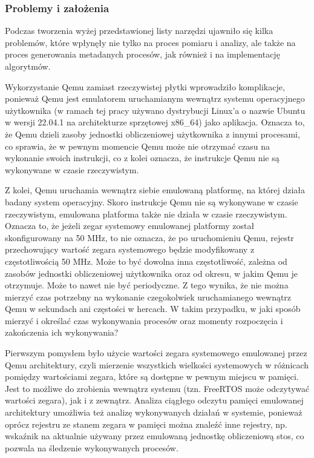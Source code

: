 \documentclass[../../main]{subfiles}
\begin{document}
\subsubsection{Problemy i założenia}

Podczas tworzenia wyżej przedstawionej listy narzędzi ujawniło się kilka problemów, które wpłynęły nie tylko na proces pomiaru i analizy, ale także na proces generowania metadanych procesów, jak również i na implementację algorytmów.

Wykorzystanie Qemu zamiast rzeczywistej płytki wprowadziło komplikacje, ponieważ Qemu jest emulatorem uruchamianym wewnątrz systemu operacyjnego użytkownika (w ramach tej pracy używano dystrybucji Linux'a o nazwie Ubuntu w wersji 22.04.1 na architekturze sprzętowej x86\_64) jako aplikacja. Oznacza to, że Qemu dzieli zasoby jednostki obliczeniowej użytkownika z innymi procesami, co sprawia, że w pewnym momencie Qemu może nie otrzymać czasu na wykonanie swoich instrukcji, co z kolei oznacza, że instrukcje Qemu nie są wykonywane w czasie rzeczywistym.

Z kolei, Qemu uruchamia wewnątrz siebie emulowaną platformę, na której działa badany system operacyjny. Skoro instrukcje Qemu nie są wykonywane w czasie rzeczywistym, emulowana platforma także nie działa w czasie rzeczywistym. Oznacza to, że jeżeli zegar systemowy emulowanej platformy został skonfigurowany na 50 MHz, to nie oznacza, że po uruchomieniu Qemu, rejestr przechowujący wartość zegara systemowego będzie modyfikowany z częstotliwością 50 MHz. Może to być dowolna inna częstotliwość, zależna od zasobów jednostki obliczeniowej użytkownika oraz od okresu, w jakim Qemu je otrzymuje. Może to nawet nie być periodyczne. Z tego wynika, że nie można mierzyć czas potrzebny na wykonanie czegokolwiek uruchamianego wewnątrz Qemu w sekundach ani częstości w hercach. W takim przypadku, w jaki sposób mierzyć i określać czas wykonywania procesów oraz momenty rozpoczęcia i zakończenia ich wykonywania?

Pierwszym pomysłem było użycie wartości zegara systemowego emulowanej przez Qemu architektury, czyli mierzenie wszystkich wielkości systemowych w różnicach pomiędzy wartościami zegara, które są dostępne w pewnym miejscu w pamięci. Jest to możliwe do zrobienia wewnątrz systemu (tzn. FreeRTOS może odczytywać wartości zegara), jak i z zewnątrz. Analiza ciągłego odczytu pamięci emulowanej architektury umożliwia też analizę wykonywanych działań w systemie, ponieważ oprócz rejestru ze stanem zegara w pamięci można znaleźć inne rejestry, np. wskaźnik na aktualnie używany przez emulowaną jednostkę obliczeniową stos, co pozwala na śledzenie wykonywanych procesów.
\end{document}
